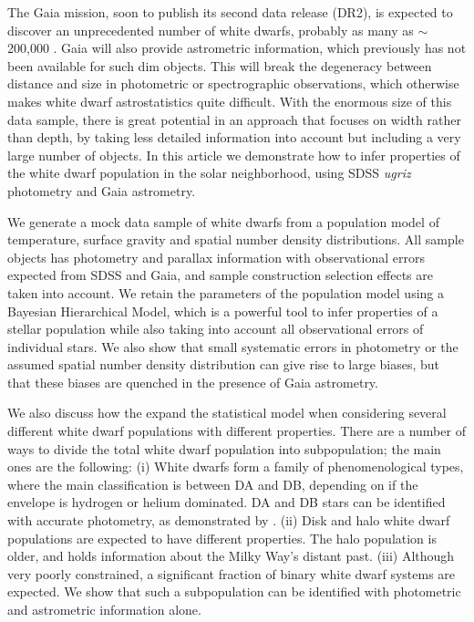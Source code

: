 \documentclass[fleqn,usenatbib]{mnras}
\begin{document}
The Gaia mission, soon to publish its second data release (DR2), is expected to discover an unprecedented number of white dwarfs, probably as many as $\sim$ 200,000 \citep{2014A&A...565A..11C,Jordan:2006jg}. Gaia will also provide astrometric information, which previously has not been available for such dim objects. This will break the degeneracy between distance and size in photometric or spectrographic observations, which otherwise makes white dwarf astrostatistics quite difficult. With the enormous size of this data sample, there is great potential in an approach that focuses on width rather than depth, by taking less detailed information into account but including a very large number of objects. In this article we demonstrate how to infer properties of the white dwarf population in the solar neighborhood, using SDSS \emph{ugriz} photometry and Gaia astrometry.

We generate a mock data sample of white dwarfs from a population model of temperature, surface gravity and spatial number density distributions. All sample objects has photometry and parallax information with observational errors expected from SDSS and Gaia, and sample construction selection effects are taken into account. We retain the parameters of the population model using a Bayesian Hierarchical Model, which is a powerful tool to infer properties of a stellar population while also taking into account all observational errors of individual stars. We also show that small systematic errors in photometry or the assumed spatial number density distribution can give rise to large biases, but that these biases are quenched in the presence of Gaia astrometry.

We also discuss how the expand the statistical model when considering several different white dwarf populations with different properties. There are a number of ways to divide the total white dwarf population into subpopulation; the main ones are the following: (i) White dwarfs form a family of phenomenological types, where the main classification is between DA and DB, depending on if the envelope is hydrogen or helium dominated. DA and DB stars can be identified with accurate photometry, as demonstrated by \cite{Mortlock:2008gf}. (ii) Disk and halo white dwarf populations are expected to have different properties. The halo population is older, and holds information about the Milky Way's distant past. (iii) Although very poorly constrained, a significant fraction of binary white dwarf systems are expected. We show that such a subpopulation can be identified with photometric and astrometric information alone.
\end{document}
